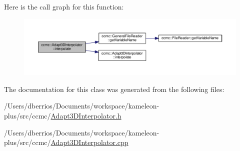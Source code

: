 Here is the call graph for this function\-:
\nopagebreak
\begin{figure}[H]
\begin{center}
\leavevmode
\includegraphics[width=350pt]{classccmc_1_1_adapt3_d_interpolator_a62f9740d20678b993f2871c6505f7df3_cgraph}
\end{center}
\end{figure}




The documentation for this class was generated from the following files\-:\begin{DoxyCompactItemize}
\item 
/\-Users/dberrios/\-Documents/workspace/kameleon-\/plus/src/ccmc/\hyperlink{_adapt3_d_interpolator_8h}{Adapt3\-D\-Interpolator.\-h}\item 
/\-Users/dberrios/\-Documents/workspace/kameleon-\/plus/src/ccmc/\hyperlink{_adapt3_d_interpolator_8cpp}{Adapt3\-D\-Interpolator.\-cpp}\end{DoxyCompactItemize}
